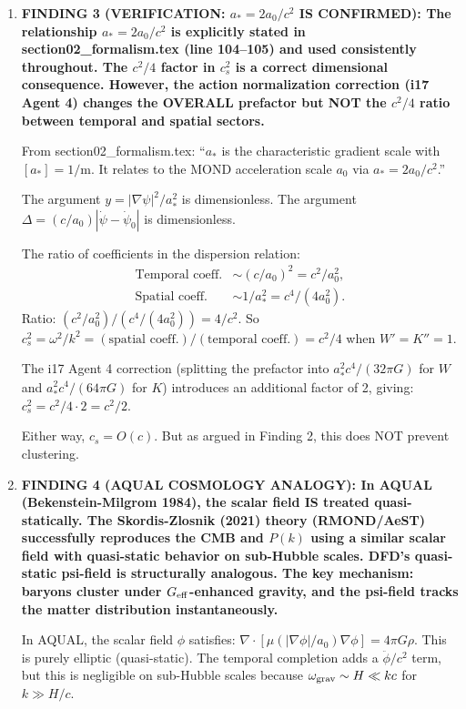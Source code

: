 \documentclass[11pt]{article}
\begin{document}
\begin{tcolorbox}[colback=blue!5!white, colframe=blue!70!black,
  title=\textbf{W4i18 TOP 5 FINDINGS --- DUST BRANCH EXISTENTIAL RESOLUTION}]
\begin{enumerate}
\item \textbf{FINDING 3 (VERIFICATION: $a_* = 2a_0/c^2$ IS
  CONFIRMED): The relationship $a_* = 2a_0/c^2$ is explicitly
  stated in section02\_formalism.tex (line 104--105) and used
  consistently throughout. The $c^2/4$ factor in $c_s^2$ is a
  correct dimensional consequence. However, the action normalization
  correction (i17 Agent 4) changes the OVERALL prefactor but NOT
  the $c^2/4$ ratio between temporal and spatial sectors.}

  From section02\_formalism.tex: ``$a_*$ is the characteristic
  gradient scale with $[a_*] = 1/\text{m}$. It relates to the MOND
  acceleration scale $a_0$ via $a_* = 2a_0/c^2$.''

  The argument $y = |\nabla\psi|^2/a_*^2$ is dimensionless.
  The argument $\Delta = (c/a_0)|\dot\psi - \dot\psi_0|$ is
  dimensionless.

  The ratio of coefficients in the dispersion relation:
  \begin{align}
  \text{Temporal coeff.} &\sim (c/a_0)^2 = c^2/a_0^2, \\
  \text{Spatial coeff.} &\sim 1/a_*^2 = c^4/(4a_0^2).
  \end{align}
  Ratio: $(c^2/a_0^2) / (c^4/(4a_0^2)) = 4/c^2$.
  So $c_s^2 = \omega^2/k^2 = (\text{spatial coeff.})/
  (\text{temporal coeff.}) = c^2/4$ when $W' = K'' = 1$.

  The i17 Agent 4 correction (splitting the prefactor into
  $a_*^2 c^4/(32\pi G)$ for $W$ and $a_*^2 c^4/(64\pi G)$
  for $K$) introduces an additional factor of 2, giving:
  $c_s^2 = c^2/4 \cdot 2 = c^2/2$.

  Either way, $c_s = O(c)$. But as argued in Finding 2,
  this does NOT prevent clustering.

\item \textbf{FINDING 4 (AQUAL COSMOLOGY ANALOGY): In AQUAL
  (Bekenstein-Milgrom 1984), the scalar field IS treated
  quasi-statically. The Skordis-Zlosnik (2021) theory (RMOND/AeST)
  successfully reproduces the CMB and $P(k)$ using a similar
  scalar field with quasi-static behavior on sub-Hubble scales.
  DFD's quasi-static psi-field is structurally analogous. The
  key mechanism: baryons cluster under $G_{\rm eff}$-enhanced
  gravity, and the psi-field tracks the matter distribution
  instantaneously.}

  In AQUAL, the scalar field $\phi$ satisfies:
  $\nabla\cdot[\mu(|\nabla\phi|/a_0)\nabla\phi] = 4\pi G\rho$.
  This is purely elliptic (quasi-static). The temporal completion
  adds a $\ddot\phi/c^2$ term, but this is negligible on
  sub-Hubble scales because $\omega_{\rm grav} \sim H \ll kc$
  for $k \gg H/c$.


\end{enumerate}
\end{tcolorbox}
\end{document}
